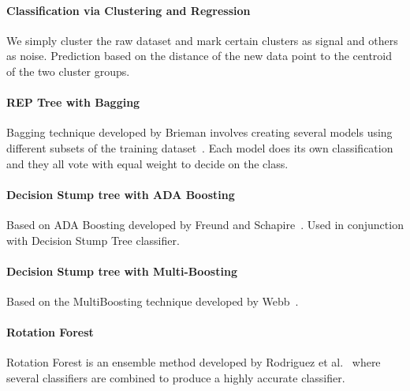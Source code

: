 \paragraph{Classification via Clustering and Regression}

We simply cluster the raw dataset and mark certain clusters as signal and others as noise. Prediction based on the distance of the new data point to the centroid of the two cluster groups. 

\paragraph{REP Tree with Bagging}

Bagging technique developed by Brieman involves creating several models using different subsets of the training dataset~\cite{Bagging}. Each model does its own classification and they all vote with equal weight to decide on the class. 


\paragraph{Decision Stump tree with ADA Boosting}

Based on ADA Boosting developed by Freund and Schapire~\cite{ADABoosting}. Used in conjunction with Decision Stump Tree classifier.

\paragraph{Decision Stump tree with Multi-Boosting}

Based on the MultiBoosting technique developed by Webb~\cite{MultiBoosting}.




\paragraph{Rotation Forest}

Rotation Forest is an ensemble method developed by Rodriguez et al.~\cite{RotationForest} where several classifiers are combined to produce a highly accurate classifier. 


